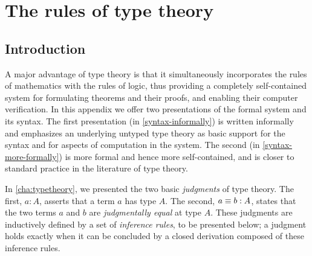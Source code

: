 \chapter{The rules of type theory}
\label{cha:rules}
\bgroup %

\newcommand{\ctx}{\ \mathsf{ctx}}
\newcommand{\emptyctx}{\ensuremath{\cdot}}

\newcommand{\production}{\vcentcolon\vcentcolon=}

\newcommand{\mkbox}[1]{\ensuremath{#1}}

\newcommand{\app}{\mathsf{app}}

\newcommand{\gothic}{\mathfrak}
\newcommand{\gP}{{\gothic p}}
\newcommand{\gM}{{\gothic M}}
\newcommand{\gN}{{\gothic N}}
\newcommand{\rats}{\mathbb{Q}}
\newcommand{\ints}{\mathbb{Z}}

\newcommand{\lbr}{\lbrack\!\lbrack}
\newcommand{\rbr}{\rbrack\!\rbrack}
\newcommand{\sem}[2] {\lbr #1 \rbr_{#2}}  %
\newcommand{\APP}[2] {{\sf app}(#1,#2)}  %
\newcommand{\nats}{\mathbb{N}}
\newcommand{\Con}{{\sf Con}}
\newcommand{\Elem}{{\sf Elem}}
\newcommand{\myId}{1}
\newcommand{\mypp}{{\sf p}}
\newcommand{\qq}{{\sf q}}
\newcommand{\mySp}{{\sf Sp}}
\newcommand{\conv}{\sim}
\newcommand{\LIM}{{\sf lim}}
\newcommand{\nn}{{\sf n}}
\newcommand{\Fam}{{\sf Fam}}

\section{Introduction}\label{formal-intro}

A major advantage of type theory is that it 
simultaneously incorporates the rules of mathematics with the rules of logic,
thus providing a completely self-contained system for formulating theorems
and their proofs, and enabling their computer verification.  In this appendix we
offer two presentations of the formal system and its syntax.  The first
presentation (in \autoref{syntax-informally}) is written informally and
emphasizes an underlying untyped type theory as basic support for the syntax
and for aspects of computation in the system.  The second (in
\autoref{syntax-more-formally}) is more formal and hence more self-contained,
and is closer to standard practice in the literature of type theory.

In \autoref{cha:typetheory}, we presented the two basic {\em judgments} of type
theory. The first, $a:A$, asserts that a term $a$ has type $A$.  The second,
$a\equiv b:A$, states that the two terms $a$ and $b$ are {\em judgmentally equal}
at type $A$. These judgments are inductively defined by a set of {\em inference
rules}, to be presented below; a judgment holds exactly when it can be concluded
by a closed derivation composed of these inference rules.

